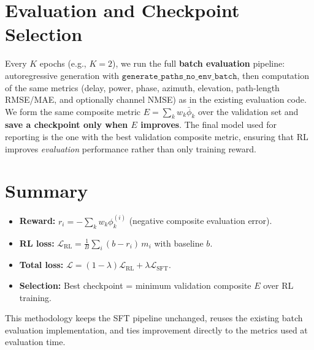 \documentclass[11pt,a4paper]{article}
\begin{document}
\section{Evaluation and Checkpoint Selection}

Every $K$ epochs (e.g., $K=2$), we run the full \textbf{batch evaluation} pipeline: autoregressive generation with $\texttt{generate\_paths\_no\_env\_batch}$, then computation of the same metrics (delay, power, phase, azimuth, elevation, path-length RMSE/MAE, and optionally channel NMSE) as in the existing evaluation code. We form the same composite metric $E = \sum_k w_k \bar{\phi}_k$ over the validation set and \textbf{save a checkpoint only when $E$ improves}. The final model used for reporting is the one with the best validation composite metric, ensuring that RL improves \emph{evaluation} performance rather than only training reward.

\section{Summary}

\begin{itemize}
  \item \textbf{Reward:} $r_i = -\sum_k w_k \phi_k^{(i)}$ (negative composite evaluation error).
  \item \textbf{RL loss:} $\mathcal{L}_{\text{RL}} = \frac{1}{B}\sum_i (b - r_i)\, m_i$ with baseline $b$.
  \item \textbf{Total loss:} $\mathcal{L} = (1-\lambda)\mathcal{L}_{\text{RL}} + \lambda\mathcal{L}_{\text{SFT}}$.
  \item \textbf{Selection:} Best checkpoint = minimum validation composite $E$ over RL training.
\end{itemize}

This methodology keeps the SFT pipeline unchanged, reuses the existing batch evaluation implementation, and ties improvement directly to the metrics used at evaluation time.
\end{document}
